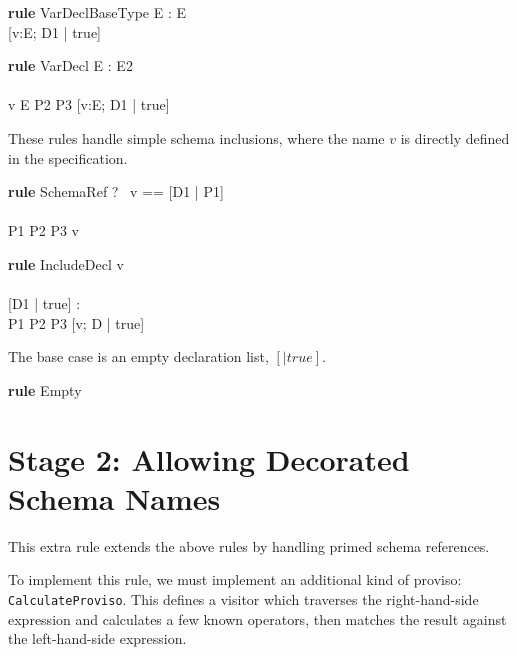 \documentclass{article}
\newenvironment{zedrule}[1]{\par\textbf{rule }#1\vspace{-1ex}\infrule}{\endinfrule}
\newcommand{\derives}{\derive{}}
\newcommand{\proviso}{\raisebox{0.5ex}{${}_{\blacktriangleright}\ $}}%
\begin{document}
\begin{zedrule}{VarDeclBaseType}
   \proviso E : \power E \\
   [D1 | true] \unfoldsTo [D2 | P2]
\derives
   [v:E; D1 | true] \unfoldsTo [v:E; D2 | P2]
\end{zedrule}

\begin{zedrule}{VarDecl}
   \proviso E : \power E2 \\
   [D1 | true] \unfoldsTo [D2 | P2] \\
   v \in E \land P2 \iff P3
\derives
   [v:E; D1 | true] \unfoldsTo [v:E2; D2 | P3]
\end{zedrule}

These rules handle simple schema inclusions, where the name $v$ is
directly defined in the specification.

\begin{zedrule}{SchemaRef}
  \proviso ?~ v == [D1 | P1] \\
  [D1 | true] \unfoldsTo [D2 | P2] \\
  P1 \land P2 \iff P3
\derives
  v \unfoldsTo [D2 | P3]
\end{zedrule}


\begin{zedrule}{IncludeDecl}
   v \unfoldsTo [D1 | P1] \\
   [D | true] \unfoldsTo [D2 | P2] \\
   \proviso [D1 | true] \land [D2 | true] : \power [D3] \\
   P1 \land P2 \iff P3
\derives
   [v; D | true] \unfoldsTo [D3 | P3]
\end{zedrule}

The base case is an empty declaration list, $[|true]$.
\begin{zedrule}{Empty}
   [~ | true] \unfoldsTo [~ | true]
\end{zedrule}


\section*{Stage 2: Allowing Decorated Schema Names}

This extra rule extends the above rules by handling primed schema
references.

To implement this rule, we must implement an additional kind of
proviso: \verb!CalculateProviso!.  This defines a visitor which
traverses the right-hand-side expression and calculates a few known
operators, then matches the result against the left-hand-side expression.
\end{document}
